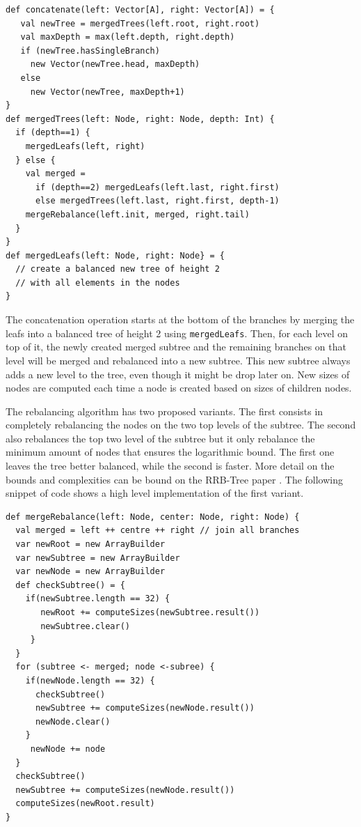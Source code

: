 %
\begin{lstlisting}[frame=single]
def concatenate(left: Vector[A], right: Vector[A]) = {
   val newTree = mergedTrees(left.root, right.root)
   val maxDepth = max(left.depth, right.depth)
   if (newTree.hasSingleBranch)
     new Vector(newTree.head, maxDepth)
   else 
     new Vector(newTree, maxDepth+1)
}
def mergedTrees(left: Node, right: Node, depth: Int) {
  if (depth==1) {
    mergedLeafs(left, right)
  } else { 
    val merged = 
      if (depth==2) mergedLeafs(left.last, right.first) 
      else mergedTrees(left.last, right.first, depth-1)
    mergeRebalance(left.init, merged, right.tail)
  }
}
def mergedLeafs(left: Node, right: Node} = {
  // create a balanced new tree of height 2 
  // with all elements in the nodes
}
\end{lstlisting}

The concatenation operation starts at the bottom of the branches by merging the leafs into a balanced tree of height 2 using \texttt{mergedLeafs}. Then, for each level on top of it, the newly created merged subtree and the remaining branches on that level will be merged and rebalanced into a new subtree. This new subtree always adds a new level to the tree, even though it might be drop later on. New sizes of nodes are computed each time a node is created based on sizes of children nodes.

The rebalancing algorithm has two proposed variants. The first consists in completely rebalancing the nodes on the two top levels of the subtree. The second also rebalances the top two level of the subtree but it only rebalance the minimum amount of nodes that ensures the logarithmic bound. The first one leaves the tree better balanced, while the second is faster. More detail on the bounds and complexities can be bound on the RRB-Tree paper \cite{RRBTrees}. The following snippet of code shows a high level implementation of the first variant.

\begin{lstlisting}[frame=single]
def mergeRebalance(left: Node, center: Node, right: Node) {
  val merged = left ++ centre ++ right // join all branches
  var newRoot = new ArrayBuilder
  var newSubtree = new ArrayBuilder
  var newNode = new ArrayBuilder
  def checkSubtree() = {
    if(newSubtree.length == 32) {
       newRoot += computeSizes(newSubtree.result())
       newSubtree.clear()
     }
  }
  for (subtree <- merged; node <-subree) {
    if(newNode.length == 32) {
      checkSubtree()
      newSubtree += computeSizes(newNode.result())
      newNode.clear()
    } 
     newNode += node
  }
  checkSubtree()
  newSubtree += computeSizes(newNode.result())
  computeSizes(newRoot.result)
}

\end{lstlisting}


